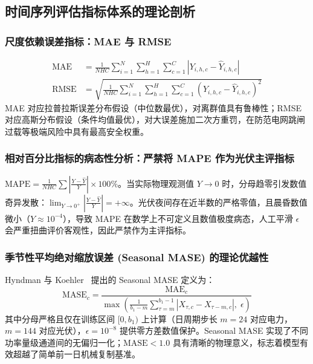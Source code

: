 \subsection{时间序列评估指标体系的理论剖析}
\label{subsec:metrics_zh}

\subsubsection{尺度依赖误差指标：MAE 与 RMSE}
\begin{align}
    \text{MAE} &= \frac{1}{N H C} \sum_{i=1}^N \sum_{h=1}^H \sum_{c=1}^C \left| Y_{i, h, c} - \hat{Y}_{i, h, c} \right| \\
    \text{RMSE} &= \sqrt{\frac{1}{N H C} \sum_{i=1}^N \sum_{h=1}^H \sum_{c=1}^C \left( Y_{i, h, c} - \hat{Y}_{i, h, c} \right)^2}
\end{align}
MAE 对应拉普拉斯误差分布假设（中位数最优），对离群值具有鲁棒性；RMSE 对应高斯分布假设（条件均值最优），对大误差施加二次方重罚，在防范电网跳闸过载等极端风险中具有最高安全权重。

\subsubsection{相对百分比指标的病态性分析：严禁将 MAPE 作为光伏主评指标}
$\text{MAPE} = \frac{1}{N H C} \sum \left| \frac{Y - \hat{Y}}{Y} \right| \times 100\%$。当实际物理观测值 $Y \to 0$ 时，分母趋零引发数值奇异发散：$\lim_{Y \to 0^+} |\frac{Y - \hat{Y}}{Y}| = +\infty$。光伏夜间存在近半数的严格零值，且晨昏数值微小（$Y \approx 10^{-4}$），导致 MAPE 在数学上不可定义且数值极度病态，人工平滑 $\epsilon$ 会严重扭曲评价客观性，因此严禁作为主评指标。

\subsubsection{季节性平均绝对缩放误差 (Seasonal MASE) 的理论优越性}
Hyndman 与 Koehler~\cite{hyndman2006another} 提出的 Seasonal MASE 定义为：
\begin{equation}
    \text{MASE}_c = \frac{\text{MAE}_c}{\max\left(\frac{1}{b_1 - m} \sum_{\tau=m}^{b_1-1} \left| X_{\tau, c} - X_{\tau-m, c} \right|, \; \epsilon\right)}
\end{equation}
其中分母严格且仅在训练区间 $[0, b_1)$ 上计算（日周期步长 $m=24$ 对应电力，$m=144$ 对应光伏），$\epsilon=10^{-8}$ 提供零方差数值保护。Seasonal MASE 实现了不同功率量级通道间的无偏归一化；$\text{MASE} < 1.0$ 具有清晰的物理意义，标志着模型有效超越了简单前一日机械复制基准。

